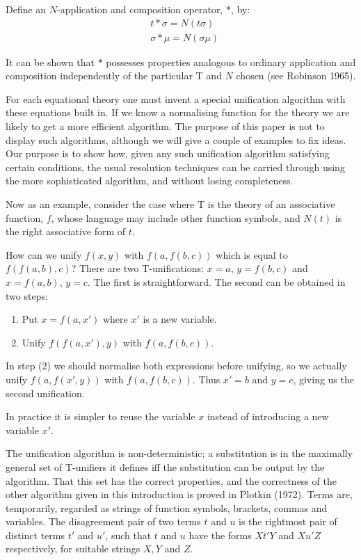 \documentclass[letterpaper]{report}
\begin{document}
Define an $N$-application and composition operator, $*$, by:
\begin{align*}
&t*\sigma=N(t\sigma)\\
&\sigma*\mu=N(\sigma\mu)
\end{align*}

It can be shown that $*$ possesses properties analogous to ordinary
application and composition independently of the particular $\mathrm{T}$ and
$N$ chosen (see Robinson 1965).

For each equational theory one must invent a special unification
algorithm with these equations built in. If we know a normalising
function for the theory we are likely to get a more efficient algorithm.
The purpose of this paper is not to display such algorithms, although we
will give a couple of examples to fix ideas. Our purpose is to show how,
given any such unification algorithm satisfying certain conditions, the
usual resolution techniques can
be carried through using the more sophisticated algorithm, and without
losing completeness.

Now as an example, consider the case where $\mathrm{T}$ is the theory of an
associative function, $f$, whose language may include other function
symbols, and $N(t)$ is the right associative form of $t$.

How can we unify $f(x,y)$ with $f(a,f(b,c))$ which is equal to
$f(f(a,b),c)$? There are two $\mathrm{T}$-unifications: $x = a$, $y = f(b,c)$
and $x = f(a,b)$, $y = c$. The first is straightforward. The second
can be obtained in two steps:

\begin{enumerate}
	\def\labelenumi{(\arabic{enumi})}
	\item
	Put $x = f(a,x')$ where $x'$ is a new variable.
	\item
	Unify $f(f(a,x'),y)$ with $f(a,f(b,c))$.
\end{enumerate}

In step (2) we should normalise both expressions before unifying, so we
actually unify $f(a,f(x',y))$ with $f(a,f(b,c))$. Thus
$x' = b$ and $y = c$, giving us the second unification.

In practice it is simpler to reuse the variable $x$ instead of
introducing a new variable $x'$.

The unification algorithm is non-deterministic; a substitution is in the
maximally general set of $\mathrm{T}$-unifiers it defines iff the substitution
can be output by the algorithm. That this set has the correct
properties, and the correctness of the other algorithm given in this
introduction is proved in Plotkin (1972). Terms are, temporarily,
regarded as strings of function symbols, brackets, commas and variables.
The disagreement pair of two terms $t$ and $u$ is the rightmost pair
of distinct terms $t'$ and $u'$, such that $t$ and
$u$ have the forms $Xt'Y$ and $Xu'Z$ respectively,
for suitable strings $X, Y$ and $Z$.
\end{document}
